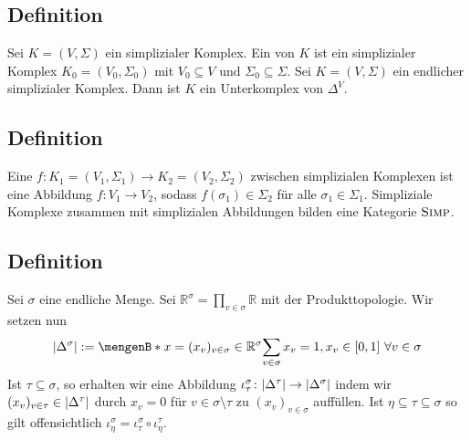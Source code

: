 \subsection[Definition: Unterkomplex]{Definition} %
\label{sub:24}
Sei $K=(V, \Sigma)$ ein simplizialer Komplex. Ein  von $K$ ist ein simplizialer Komplex $K_0 = (V_0, \Sigma_0)$ mit 
$V_0 \subseteq V$ und $\Sigma_0 \subseteq \Sigma$.
Sei $K=(V,\Sigma)$ ein endlicher simplizialer Komplex. Dann ist $K$ ein Unterkomplex von $\Delta^V$.

\subsection[Definition: Simpliziale Abbildung]{Definition} %
\label{sub:25}
Eine  $f \colon K_1=(V_1, \Sigma_1) \to K_2=(V_2, \Sigma_2)$ zwischen simplizialen Komplexen ist eine Abbildung $f \colon V_1 \to V_2$, sodass 
$f(\sigma_1) \in \Sigma_2$ für alle $\sigma_1 \in \Sigma_1$. Simpliziale Komplexe zusammen mit simplizialen Abbildungen bilden eine Kategorie $\SIMP$.

\subsection[Definition: Geometrische Realisierung]{Definition} %
\label{sub:26}
Sei $\sigma$ eine endliche Menge. Sei $\mathds{R}^\sigma = \prod_{v \in \sigma} \mathds{R}$ mit der Produkttopologie. Wir setzen nun 
\[
	\abs*{\Delta^\sigma} := \set[x=(x_v)_{v \in \sigma} \in \mathds{R}^\sigma]{\sum_{v \in \sigma}x_v = 1 , x_v \in [0,1] \,\, \forall v \in \sigma}  
\]
Ist $\tau \subseteq \sigma$, so erhalten wir eine Abbildung $\iota_\tau^\sigma \colon \abs*{\Delta^\tau} \to \abs*{\Delta^\sigma}$ indem wir 
$(x_v)_{v \in \tau} \in \abs*{\Delta^\tau}$ durch $x_v=0$ für $v \in \sigma \setminus \tau$ zu $(x_v)_{v \in \sigma}$ auffüllen. Ist $\eta \subseteq \tau \subseteq \sigma$ 
so gilt offensichtlich $\iota^\sigma_\eta = \iota_\tau^\sigma \circ  \iota_\eta^\tau$.

